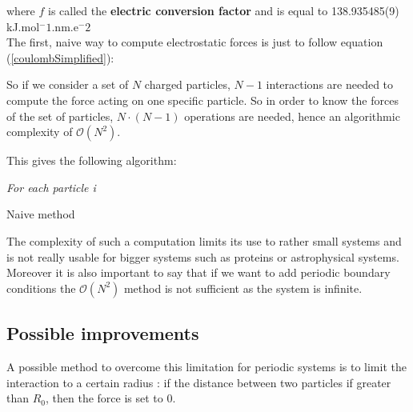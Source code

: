 \documentclass[12pt,twoside,a4paper]{report}
\begin{document}
where $f$ is called the \textbf{electric conversion factor} and is equal to 138.935485(9) kJ.mol$^-1$.nm.e$^-2$\\


The first, naive way to compute electrostatic forces is just to follow equation (\ref{coulombSimplified}):

So if we consider a set of $N$ charged particles, $N-1$ interactions are needed to compute the force acting on one specific particle. So in order to know the forces of the set of particles, $N\cdot(N-1)$ operations are needed, hence an algorithmic complexity of $\mathcal{O}(N^2)$.

This gives the following algorithm:



\IncMargin{1em}
\begin{algorithm}[H]



\BlankLine

\emph{For each particle i}\;
\caption{Naive method}\label{algo_disjdecomp}
\end{algorithm}\DecMargin{1em}


The complexity of such a computation limits its use to rather small systems and is not really usable for bigger systems such as proteins or astrophysical systems.
 Moreover it is also important to say that if we want to add periodic boundary conditions the $\mathcal{O}(N^2)$ method is not sufficient as the system is infinite.


\subsection{Possible improvements}

A possible method to overcome this limitation for periodic systems is to limit the interaction to a certain radius : if the distance between two particles if greater than $R_0$, then the force is set to $0$.
\end{document}

